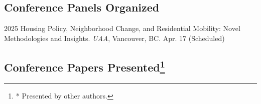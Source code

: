 \documentclass[12pt,letterpaper]{report}
\begin{document}
\subsection*{Conference Panels Organized}

\begin{tablist}
  \item[2025] \tab{}Housing Policy, Neighborhood Change, and Residential Mobility: Novel Methodologies and Insights. \emph{UAA}, Vancouver, BC. Apr. 17 (Scheduled)
\end{tablist}

\subsection*{Conference Papers Presented\footnote{ * Presented by other authors.}}
\end{document}
